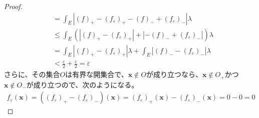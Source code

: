 \documentclass[dvipdfmx]{jsarticle}
\begin{document}
\begin{proof}
\begin{align*}
&= \int_{E} {\left| (f)_{+} - \left( f_{\varepsilon} \right)_{+} - (f)_{-} + \left( f_{\varepsilon} \right)_{-} \right|\lambda}\\
&\leq \int_{E} {\left( \left| (f)_{+} - \left( f_{\varepsilon} \right)_{+} \right| + \left| - (f)_{-} + \left( f_{\varepsilon} \right)_{-} \right| \right)\lambda}\\
&= \int_{E} {\left| (f)_{+} - \left( f_{\varepsilon} \right)_{+} \right|\lambda} + \int_{E} {\left| (f)_{-} - \left( f_{\varepsilon} \right)_{-} \right|\lambda}\\
&< \frac{\varepsilon}{2} + \frac{\varepsilon}{2} = \varepsilon
\end{align*}
さらに、その集合$O$は有界な開集合で、$\mathbf{x} \notin O$が成り立つなら、$\mathbf{x} \notin O_{+}$かつ$\mathbf{x} \notin O_{-}$が成り立つので、次のようになる。
\begin{align*}
f_{\varepsilon}\left( \mathbf{x} \right) = \left( \left( f_{\varepsilon} \right)_{+} - \left( f_{\varepsilon} \right)_{-} \right)\left( \mathbf{x} \right) = \left( f_{\varepsilon} \right)_{+}\left( \mathbf{x} \right) - \left( f_{\varepsilon} \right)_{-}\left( \mathbf{x} \right) = 0 - 0 = 0
\end{align*}
\end{proof}
\end{document}
